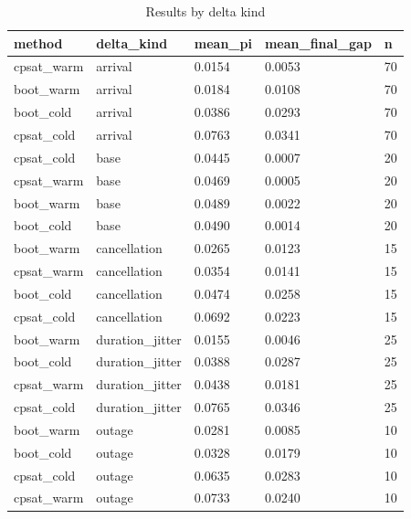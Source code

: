 \begin{table}[t]
\centering
\begin{tabular}{lllll}
\toprule
method & delta\_kind & mean\_pi & mean\_final\_gap & n \\
\midrule
cpsat\_warm & arrival & 0.0154 & 0.0053 & 70 \\
boot\_warm & arrival & 0.0184 & 0.0108 & 70 \\
boot\_cold & arrival & 0.0386 & 0.0293 & 70 \\
cpsat\_cold & arrival & 0.0763 & 0.0341 & 70 \\
cpsat\_cold & base & 0.0445 & 0.0007 & 20 \\
cpsat\_warm & base & 0.0469 & 0.0005 & 20 \\
boot\_warm & base & 0.0489 & 0.0022 & 20 \\
boot\_cold & base & 0.0490 & 0.0014 & 20 \\
boot\_warm & cancellation & 0.0265 & 0.0123 & 15 \\
cpsat\_warm & cancellation & 0.0354 & 0.0141 & 15 \\
boot\_cold & cancellation & 0.0474 & 0.0258 & 15 \\
cpsat\_cold & cancellation & 0.0692 & 0.0223 & 15 \\
boot\_warm & duration\_jitter & 0.0155 & 0.0046 & 25 \\
boot\_cold & duration\_jitter & 0.0388 & 0.0287 & 25 \\
cpsat\_warm & duration\_jitter & 0.0438 & 0.0181 & 25 \\
cpsat\_cold & duration\_jitter & 0.0765 & 0.0346 & 25 \\
boot\_warm & outage & 0.0281 & 0.0085 & 10 \\
boot\_cold & outage & 0.0328 & 0.0179 & 10 \\
cpsat\_cold & outage & 0.0635 & 0.0283 & 10 \\
cpsat\_warm & outage & 0.0733 & 0.0240 & 10 \\
\bottomrule
\end{tabular}
\caption{Results by delta kind}
\label{tab:by-delta}
\end{table}
